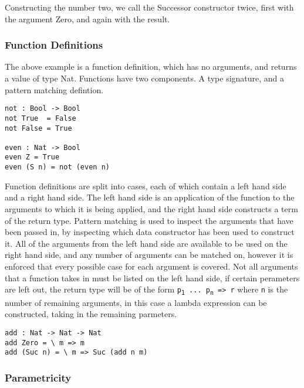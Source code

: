 \documentclass[a4paper]{article}
\begin{document}
Constructing the number two, we call the Successor constructor twice, first with the argument Zero,
and again with the result.

\subsubsection{Function Definitions}
\label{sec:org19c74b8}
The above example is a function definition, which has no arguments,
and returns a value of type Nat. Functions have two components. 
A type signature, and a pattern matching defintion.

\begin{center}
\begin{verbatim}
not : Bool -> Bool
not True  = False
not False = True

even : Nat -> Bool
even Z = True
even (S n) = not (even n) 
\end{verbatim}
\end{center}

Function definitions are split into cases, each of which contain 
a left hand side and a right hand side.
The left hand side is an application of the function to the arguments
to which it is being applied, and the right hand side constructs a term
of the return type. Pattern matching is used to inspect the arguments
that have been passed in, by inspecting which data constructor has been
used to construct it. All of the arguments from the left hand side are
available to be used on the right hand side, and any number of arguments
can be matched on, however it is enforced that every possible case for 
each argument is covered. Not all arguments that a function takes in 
must be listed on the left hand side, if certain perameters are left out,
the return type will be of the form \texttt{p\textsubscript{1} ... p\textsubscript{n} => r} where \texttt{n} is the 
number of remaining arguments, in this case a lambda expression can be 
constructed, taking in the remaining parmeters. 

\begin{center}
\begin{verbatim}
add : Nat -> Nat -> Nat
add Zero = \ m => m
add (Suc n) = \ m => Suc (add n m)
\end{verbatim}
\end{center}



\subsubsection{Parametricity}
\label{sec:org62c4f95}
\end{document}
